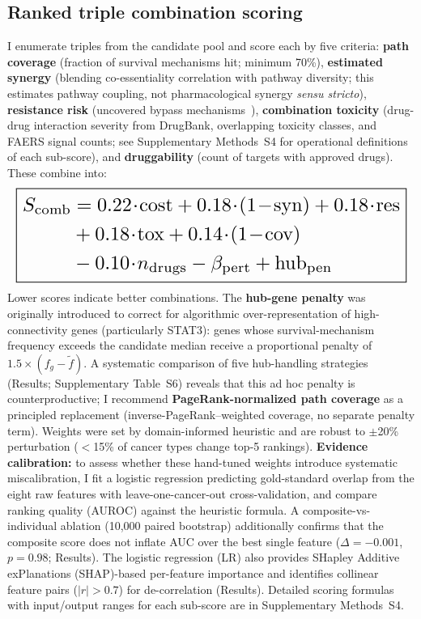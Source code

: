 \documentclass[times, twoside, watermark]{zHenriquesLab-StyleBioRxiv}
\begin{document}
\subsection*{Ranked triple combination scoring}
I enumerate triples from the candidate pool and score each by five criteria: \textbf{path coverage} (fraction of survival mechanisms hit; minimum 70\%), \textbf{estimated synergy} (blending co-essentiality correlation with pathway diversity; this estimates pathway coupling, not pharmacological synergy \textit{sensu stricto}), \textbf{resistance risk} (uncovered bypass mechanisms~\cite{Bergholz2021}), \textbf{combination toxicity} (drug-drug interaction severity from DrugBank, overlapping toxicity classes, and FAERS signal counts; see Supplementary Methods~S4 for operational definitions of each sub-score), and \textbf{druggability} (count of targets with approved drugs). These combine into:
\begin{equation}
\resizebox{\columnwidth}{!}{$\displaystyle
\boxed{\begin{aligned}
S_{\text{comb}} &= 0.22\!\cdot\!\text{cost} + 0.18\!\cdot\!(1\!-\!\text{syn}) + 0.18\!\cdot\!\text{res} \\
&+ 0.18\!\cdot\!\text{tox} + 0.14\!\cdot\!(1\!-\!\text{cov}) \\
&- 0.10\!\cdot\!n_{\text{drugs}} - \beta_{\text{pert}} + \text{hub}_{\text{pen}}
\end{aligned}}
$}
\end{equation}
Lower scores indicate better combinations. The \textbf{hub-gene penalty} was originally introduced to correct for algorithmic over-representation of high-connectivity genes (particularly STAT3): genes whose survival-mechanism frequency exceeds the candidate median receive a proportional penalty of $1.5 \times (f_g - \tilde{f})$. A systematic comparison of five hub-handling strategies (Results; Supplementary Table~S6) reveals that this ad hoc penalty is counterproductive; I recommend \textbf{PageRank-normalized path coverage} as a principled replacement (inverse-PageRank--weighted coverage, no separate penalty term). Weights were set by domain-informed heuristic and are robust to $\pm$20\% perturbation ($<$15\% of cancer types change top-5 rankings). \textbf{Evidence calibration:} to assess whether these hand-tuned weights introduce systematic miscalibration, I fit a logistic regression predicting gold-standard overlap from the eight raw features with leave-one-cancer-out cross-validation, and compare ranking quality (AUROC) against the heuristic formula. A composite-vs-individual ablation (10{,}000 paired bootstrap) additionally confirms that the composite score does not inflate AUC over the best single feature ($\Delta = -0.001$, $p = 0.98$; Results). The logistic regression (LR) also provides SHapley Additive exPlanations (SHAP)-based per-feature importance and identifies collinear feature pairs ($|r| > 0.7$) for de-correlation (Results). Detailed scoring formulas with input/output ranges for each sub-score are in Supplementary Methods~S4.
\end{document}
